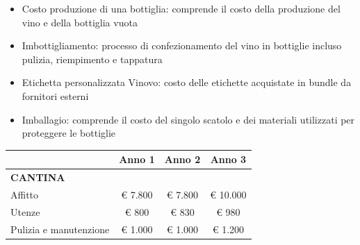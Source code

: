 \documentclass[12pt, a4paper]{article}
\begin{document}
\begin{itemize}
    \item Costo produzione di una bottiglia: comprende il costo della produzione del vino e della bottiglia vuota
    \item Imbottigliamento: processo di confezionamento del vino in bottiglie incluso pulizia, riempimento e tappatura
    \item Etichetta personalizzata Vinovo: costo delle etichette acquistate in bundle da fornitori esterni
    \item Imballagio: comprende il costo del singolo scatolo e dei materiali utilizzati per proteggere le bottiglie
\end{itemize}
\begin{longtable}{|lccc|}
    \hline
    \rowcolor[HTML]{CBCEFB}
    \multicolumn{1}{|l|}{\cellcolor[HTML]{CBCEFB}\textbf{COSTO GESTIONE}}                                                                                 & \multicolumn{1}{c|}{\cellcolor[HTML]{CBCEFB}\textbf{Anno 1}}   & \multicolumn{1}{c|}{\cellcolor[HTML]{CBCEFB}\textbf{Anno 2}}   & \textbf{Anno 3}   \\ \hline
    \multicolumn{4}{|l|}{\textbf{CANTINA}}                                                                                                                                                                                                                                                                      \\ \hline
    \multicolumn{1}{|l|}{Affitto}                                                                                                                         & \multicolumn{1}{c|}{€ 7.800}                                   & \multicolumn{1}{c|}{€ 7.800}                                   & € 10.000          \\ \hline
    \multicolumn{1}{|l|}{Utenze}                                                                                                                          & \multicolumn{1}{c|}{€ 800}                                     & \multicolumn{1}{c|}{€ 830}                                     & € 980             \\ \hline
    \multicolumn{1}{|l|}{Pulizia e manutenzione}                                                                                                          & \multicolumn{1}{c|}{€ 1.000}                                   & \multicolumn{1}{c|}{€ 1.000}                                   & € 1.200           \\ \hline

\end{longtable}
\end{document}
